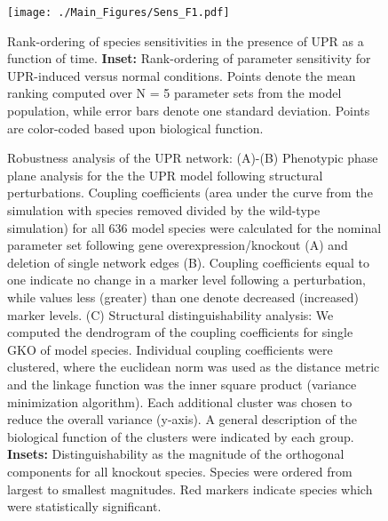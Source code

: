 \documentclass[fleqn,10pt]{wlscirep}
\begin{document}
\begin{figure}\centering
\texttt{[image: ./Main\_Figures/Sens\_F1.pdf]}
	\caption{Rank-ordering of species sensitivities in the presence of UPR as a function of time.
	\textbf{Inset:} Rank-ordering of parameter sensitivity for UPR-induced versus normal conditions.
Points denote the mean ranking computed over N = 5 parameter sets from the model population, while error bars denote one standard deviation. Points are color-coded based upon biological function.}
	\label{fg:fig5}
\end{figure}

\begin{figure}\centering
{}
	\caption{Robustness analysis of the UPR network: (A)-(B) Phenotypic phase plane analysis for the the UPR model following structural perturbations. Coupling coefficients (area under the curve from the simulation with species removed divided by the wild-type simulation) for all 636 model species were calculated for the nominal parameter set following gene overexpression/knockout (A) and deletion of single network edges (B). Coupling coefficients equal to one indicate no change in a marker level following a perturbation, while values less (greater) than one denote decreased (increased) marker levels. (C) Structural distinguishability analysis: We computed the dendrogram of the coupling coefficients for single GKO of model species. Individual coupling coefficients were clustered, where the euclidean norm was used as the distance metric and the linkage function was the inner square product (variance minimization algorithm). Each additional cluster was chosen to reduce the overall variance (y-axis). A general description of the biological function of the clusters were indicated by each group. \textbf{Insets:} Distinguishability as the magnitude of the orthogonal components for all knockout species.  Species were ordered from largest to smallest magnitudes.  Red markers indicate species which were statistically significant.}
	\label{fg:robustness_figure}
\end{figure}

\clearpage

\renewcommand\thefigure{S\arabic{figure}}
\renewcommand\thetable{T\arabic{table}}
\renewcommand\thepage{S-\arabic{page}}
\renewcommand\theequation{S\arabic{equation}}

\setcounter{equation}{0}
\setcounter{table}{0}
\setcounter{figure}{0}
\setcounter{page}{1}
\end{document}
